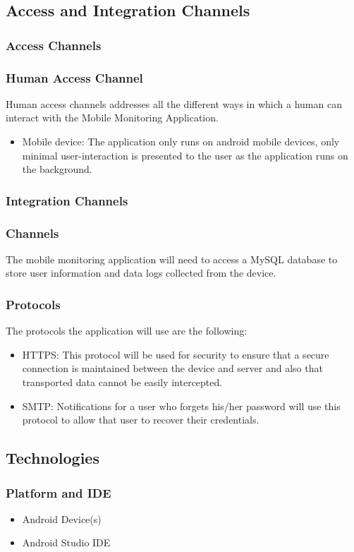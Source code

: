 	\subsection{Access and Integration Channels}
	\subsubsection{Access Channels}
	\subsubsection*{Human Access Channel}
	Human access channels addresses all the different ways in which a human can interact with the Mobile Monitoring Application.
	\begin{itemize}
		\item Mobile device: The application only runs on android mobile devices, only minimal user-interaction is presented to the user as the application runs on the background.   
	\end{itemize}
	\subsubsection{Integration Channels}
	\subsubsection*{Channels}
	The mobile monitoring application will need to access a MySQL database to store user information and data logs collected from the device.    	\subsubsection*{Protocols}
	The protocols the application will use are the following:
	\begin{itemize}
	\item HTTPS: This protocol will be used for security to ensure that a secure connection is maintained between the device and server and also that transported data cannot be easily intercepted.
	\item SMTP: Notifications for a user who forgets his/her password will use this protocol to allow that user to recover their credentials.  
	\end{itemize}	 
	\newpage
	\subsection{Technologies}
	\subsubsection{Platform and IDE}
	\begin{itemize}
	\item Android Device(s)
	\item Android Studio IDE
	\end{itemize}
